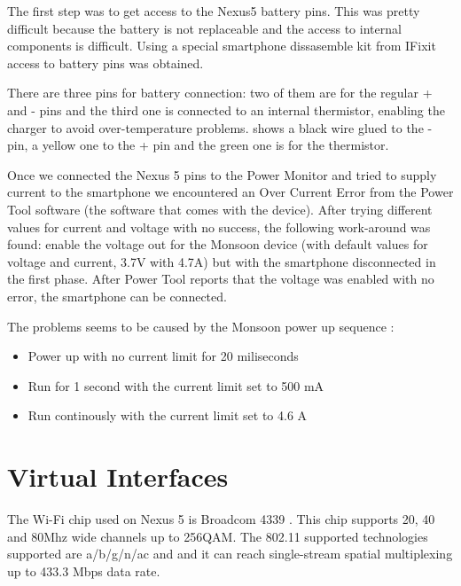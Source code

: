 The first step was to get access to the Nexus5 battery pins. This was pretty difficult because the battery is not replaceable and the access to internal components is difficult. Using a special smartphone dissasemble kit from IFixit \cite{cite-ifixit} access to battery pins was obtained.

There are three pins for battery connection: two of them are for the regular + and - pins and the third one is connected to an internal thermistor, enabling the charger to avoid over-temperature problems.  shows a black wire glued to the - pin, a yellow one to the + pin and the green one is for the thermistor.

Once we connected the Nexus 5 pins to the Power Monitor and tried to supply current to the smartphone we encountered an Over Current Error from the Power Tool software (the software that comes with the device). After trying different values for current and voltage with no success, the following work-around was found: enable the voltage out for the Monsoon device (with default values for voltage and current, 3.7V with 4.7A) but with the smartphone disconnected in the first phase. After Power Tool reports that the voltage was enabled with no error, the smartphone can be connected.


The problems seems to be caused by the Monsoon power up sequence \cite{cite-manualmonsoon}:
\begin{itemize}
  \item Power up with no current limit for 20 miliseconds
  \item Run for 1 second with the current limit set to 500 mA
  \item Run continously with the current limit set to 4.6 A
\end{itemize}

\section{Virtual Interfaces}
\label{sec:virtual-interfaces}

The Wi-Fi chip used on Nexus 5 is Broadcom 4339 \cite{cite-wifichip} \cite{cite-ifixit}. This chip supports 20, 40 and 80Mhz wide channels up to 256QAM. The 802.11 supported technologies supported are a/b/g/n/ac and and it can reach single-stream spatial multiplexing up to 433.3 Mbps data rate. 

